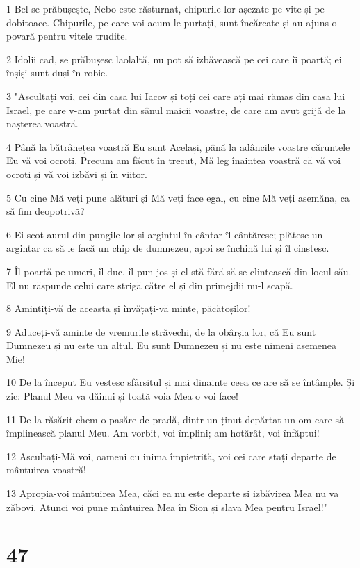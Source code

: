 \par 1 Bel se prăbușește, Nebo este răsturnat, chipurile lor așezate pe vite și pe dobitoace. Chipurile, pe care voi acum le purtați, sunt încărcate și au ajuns o povară pentru vitele trudite.
\par 2 Idolii cad, se prăbușesc laolaltă, nu pot să izbăvească pe cei care îi poartă; ei înșiși sunt duși în robie.
\par 3 "Ascultați voi, cei din casa lui Iacov și toți cei care ați mai rămas din casa lui Israel, pe care v-am purtat din sânul maicii voastre, de care am avut grijă de la nașterea voastră.
\par 4 Până la bătrânețea voastră Eu sunt Același, până la adâncile voastre căruntele Eu vă voi ocroti. Precum am făcut în trecut, Mă leg înaintea voastră că vă voi ocroti și vă voi izbăvi și în viitor.
\par 5 Cu cine Mă veți pune alături și Mă veți face egal, cu cine Mă veți asemăna, ca să fim deopotrivă?
\par 6 Ei scot aurul din pungile lor și argintul în cântar îl cântăresc; plătesc un argintar ca să le facă un chip de dumnezeu, apoi se închină lui și îl cinstesc.
\par 7 Îl poartă pe umeri, îl duc, îl pun jos și el stă fără să se clintească din locul său. El nu răspunde celui care strigă către el și din primejdii nu-l scapă.
\par 8 Amintiți-vă de aceasta și învățați-vă minte, păcătoșilor!
\par 9 Aduceți-vă aminte de vremurile străvechi, de la obârșia lor, că Eu sunt Dumnezeu și nu este un altul. Eu sunt Dumnezeu și nu este nimeni asemenea Mie!
\par 10 De la început Eu vestesc sfârșitul și mai dinainte ceea ce are să se întâmple. Și zic: Planul Meu va dăinui și toată voia Mea o voi face!
\par 11 De la răsărit chem o pasăre de pradă, dintr-un ținut depărtat un om care să împlinească planul Meu. Am vorbit, voi împlini; am hotărât, voi înfăptui!
\par 12 Ascultați-Mă voi, oameni cu inima împietrită, voi cei care stați departe de mântuirea voastră!
\par 13 Apropia-voi mântuirea Mea, căci ea nu este departe și izbăvirea Mea nu va zăbovi. Atunci voi pune mântuirea Mea în Sion și slava Mea pentru Israel!"

\chapter{47}

